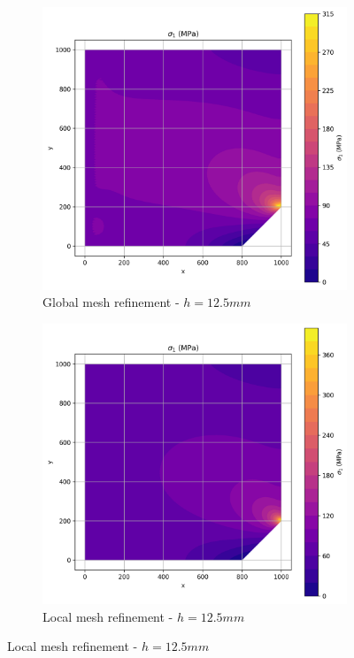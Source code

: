 \begin{figure}[H]
  \centering
  \begin{subfigure}[b]{0.45\textwidth}
    \centering
    \includegraphics[width=\textwidth]{GRAFICOS/Quad9/1.5mm_global/resultados - sigma_1.png}
    \caption{Global mesh refinement - $h=12.5mm$}
    \label{fig:img12}
  \end{subfigure}
  \hfill
  \begin{subfigure}[b]{0.45\textwidth}
    \centering
    \includegraphics[width=\textwidth]{GRAFICOS/Quad9/1.5mm_local/resultados - sigma_1.png}
    \caption{Local mesh refinement - $h=12.5mm$}
    \label{fig:img22}
  \end{subfigure}
\end{figure}

